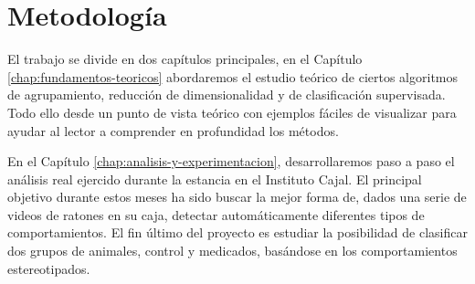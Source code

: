 \section{Metodología} \label{sec:metodología}

El trabajo se divide en dos capítulos principales, en el Capítulo \ref{chap:fundamentos-teoricos} abordaremos el estudio teórico de ciertos algoritmos de agrupamiento, reducción de dimensionalidad y de clasificación supervisada. Todo ello desde un punto de vista teórico con ejemplos fáciles de visualizar para ayudar al lector a comprender en profundidad los métodos.

En el Capítulo \ref{chap:analisis-y-experimentacion}, desarrollaremos paso a paso el análisis real ejercido durante la estancia en el Instituto Cajal. El principal objetivo durante estos meses ha sido buscar la mejor forma de, dados una serie de videos de ratones en su caja, detectar automáticamente diferentes tipos de comportamientos. El fin último del proyecto es estudiar la posibilidad de clasificar dos grupos de animales, control y medicados, basándose en los comportamientos estereotipados.
